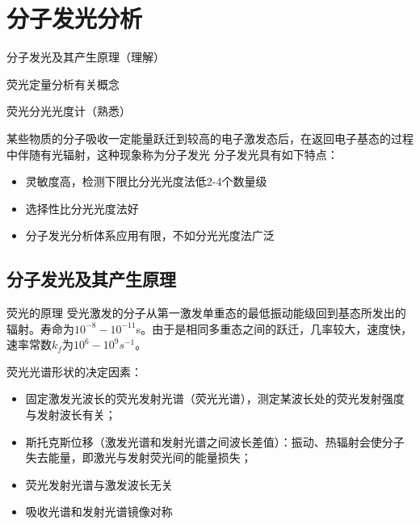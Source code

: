 \chapter{分子发光分析}

\begin{introduction}
	\item 分子发光及其产生原理（理解）
	\item 荧光定量分析有关概念
	\item 荧光分光光度计（熟悉）
\end{introduction}


某些物质的分子吸收一定能量跃迁到较高的电子激发态后，在返回电子基态的过程中伴随有光辐射，这种现象称为分子发光
分子发光具有如下特点：
\begin{itemize}
	\item 灵敏度高，检测下限比分光光度法低2-4个数量级
	\item 选择性比分光光度法好
	\item 分子发光分析体系应用有限，不如分光光度法广泛
\end{itemize}
\section{分子发光及其产生原理}

\begin{definition*}{荧光的原理}
	受光激发的分子从第一激发单重态的最低振动能级回到基态所发出的辐射。寿命为$10^{-8} - 10^{-11}$s。由于是相同多重态之间的跃迁，几率较大，速度快，速率常数$k_f$为$10^{6}-10^{9} s^{-1}$。
\end{definition*}
荧光光谱形状的决定因素：
\begin{itemize}
	\item 固定激发光波长的荧光发射光谱（荧光光谱），测定某波长处的荧光发射强度与发射波长有关；
	\item 斯托克斯位移（激发光谱和发射光谱之间波长差值）：振动、热辐射会使分子失去能量，即激光与发射荧光间的能量损失；
	\item 荧光发射光谱与激发波长无关
	\item 吸收光谱和发射光谱镜像对称
\end{itemize}

